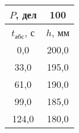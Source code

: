 \begin{tabular}[t]{|c|c|}
\hline
$P$, дел & 100 \\
\hline
$t_{абс}$, с & $h$, мм \\ 
\hline
0,0 & 200,0 \\ 
33,0 & 195,0 \\ 
61,0 & 190,0 \\ 
99,0 & 185,0 \\ 
124,0 & 180,0 \\ 
\hline
\end{tabular}